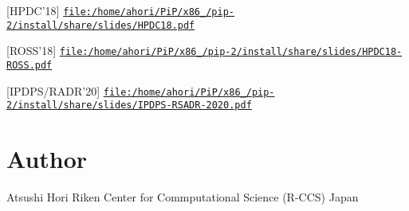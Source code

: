 \begin{DoxyItemize}
\item \mbox{[}H\-P\-D\-C'18\mbox{]} \href{file:/home/ahori/PiP/x86_64/pip-2/install/share/slides/HPDC18.pdf}{\tt file\-:/home/ahori/\-Pi\-P/x86\-\_/pip-\/2/install/share/slides/\-H\-P\-D\-C18.\-pdf}
\item \mbox{[}R\-O\-S\-S'18\mbox{]} \href{file:/home/ahori/PiP/x86_64/pip-2/install/share/slides/HPDC18-ROSS.pdf}{\tt file\-:/home/ahori/\-Pi\-P/x86\-\_/pip-\/2/install/share/slides/\-H\-P\-D\-C18-\/\-R\-O\-S\-S.\-pdf}
\item \mbox{[}I\-P\-D\-P\-S/\-R\-A\-D\-R'20\mbox{]} \href{file:/home/ahori/PiP/x86_64/pip-2/install/share/slides/IPDPS-RSADR-2020.pdf}{\tt file\-:/home/ahori/\-Pi\-P/x86\-\_/pip-\/2/install/share/slides/\-I\-P\-D\-P\-S-\/\-R\-S\-A\-D\-R-\/2020.\-pdf} \section*{Author}
\end{DoxyItemize}

Atsushi Hori Riken Center for Commputational Science (R-\/\-C\-C\-S) Japan 